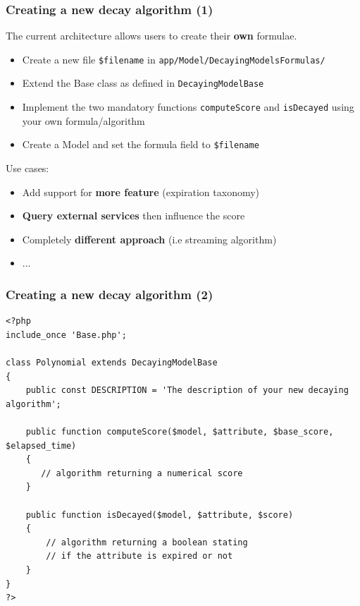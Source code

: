 \begin{frame}
    \frametitle{Creating a new decay algorithm (1)}
    The current architecture allows users to create their \textbf{own} formulae.

    \begin{itemize}
        \item Create a new file \texttt{{\$}filename} in \texttt{app/Model/DecayingModelsFormulas/}
        \item Extend the Base class as defined in \texttt{DecayingModelBase}
        \item Implement the two mandatory functions \texttt{computeScore} and \texttt{isDecayed} using your own formula/algorithm
        \item Create a Model and set the formula field to \texttt{{\$}filename}
    \end{itemize}

    Use cases:
    \begin{itemize}
        \item Add support for \textbf{more feature} (expiration taxonomy)
        \item \textbf{Query external services} then influence the score
        \item Completely \textbf{different approach} (i.e streaming algorithm)
        \item ...
    \end{itemize}

\end{frame}

\lstset{language=PHP}
\begin{frame}[fragile]
    \frametitle{Creating a new decay algorithm (2)}
    \lstset{basicstyle=\scriptsize}
    \begin{lstlisting}
<?php
include_once 'Base.php';

class Polynomial extends DecayingModelBase
{
    public const DESCRIPTION = 'The description of your new decaying algorithm';

    public function computeScore($model, $attribute, $base_score, $elapsed_time)
    {
       // algorithm returning a numerical score
    }

    public function isDecayed($model, $attribute, $score)
    {
        // algorithm returning a boolean stating
        // if the attribute is expired or not
    }
}
?>
    \end{lstlisting}
\end{frame}
